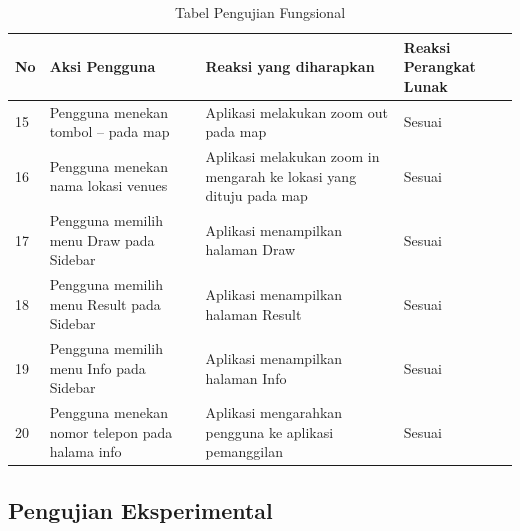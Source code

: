 \begin{table}[H]
\caption{Tabel Pengujian Fungsional}
\label{table:tabelPengujianFungsional}
\begin{tabular}{|p{0.3cm}|p{5.7cm}|p{5.7cm}|p{3cm}|}
\hline
No & Aksi Pengguna                                                                      & Reaksi yang diharapkan                                                               & Reaksi Perangkat Lunak \\ \hline
15 & Pengguna menekan tombol – pada map                                                 & Aplikasi melakukan zoom out pada map                                                 & Sesuai                 \\ \hline
16 & Pengguna menekan nama lokasi venues                                                & Aplikasi melakukan zoom in mengarah ke lokasi yang dituju pada map                   & Sesuai                 \\ \hline
17 & Pengguna memilih menu Draw pada Sidebar                                            & Aplikasi menampilkan halaman Draw                                                    & Sesuai                 \\ \hline
18 & Pengguna memilih menu Result pada Sidebar                                          & Aplikasi menampilkan halaman Result                                                  & Sesuai                 \\ \hline
19 & Pengguna memilih menu Info pada Sidebar                                            & Aplikasi menampilkan halaman Info                                                    & Sesuai                 \\ \hline
20 & Pengguna menekan nomor telepon pada halama info                                    & Aplikasi mengarahkan pengguna ke aplikasi pemanggilan                                & Sesuai                 \\ \hline
\end{tabular}
\end{table}
\subsection{Pengujian Eksperimental}
\label{subsec:pengujianEksperimental}

